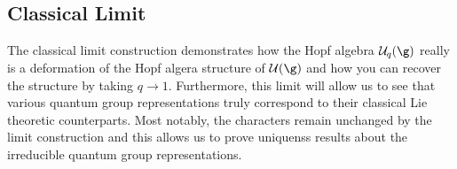 \documentclass[11pt,leqno,oneside]{amsart}
\numberwithin{thm}{section}
\newcommand{\U}{\mathcal{U}}
\begin{document}
\subsection{Classical Limit}
The classical limit construction demonstrates how the Hopf algebra
\(\U_q(\g)\) really is a deformation of the Hopf algera structure of
\(\U(\g)\) and how you can recover the structure by taking \(q \to
1\). Furthermore, this limit will allow us to see that various quantum
group representations truly correspond to their classical Lie
theoretic counterparts. Most notably, the characters remain unchanged
by the limit construction and this allows us to prove uniquenss
results about the irreducible quantum group representations.
\begin{bibdiv}
  \begin{biblist}
  \end{biblist}
\end{bibdiv}
\end{document}

